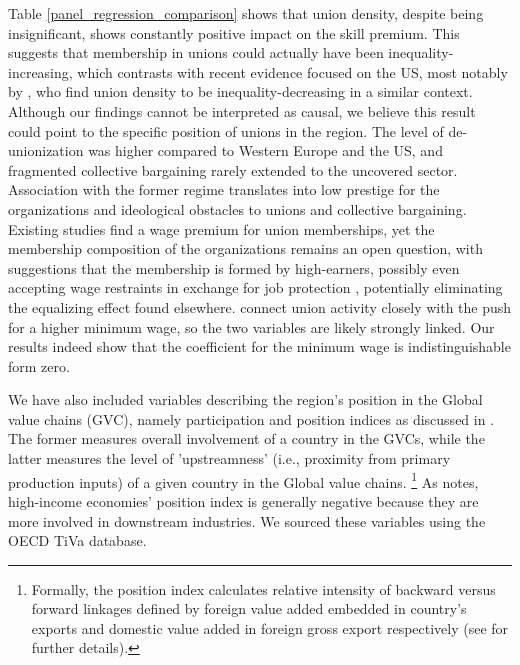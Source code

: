 \documentclass[11pt]{article}
\begin{document}
Table \ref{panel_regression_comparison} shows that union density, despite 
being insignificant, shows constantly positive impact on the skill premium. This suggests that membership in unions could actually have been inequality-increasing, which contrasts with recent evidence focused on the US, most notably by \citet{farber2021unions}, who find union density to be inequality-decreasing in a similar context. Although our findings cannot be interpreted as causal, we believe this result could point to the specific position of unions in the region. The level of de-unionization was higher compared to Western Europe and the US, and fragmented collective bargaining rarely extended to the uncovered sector. Association with the former regime translates into low prestige for the organizations and ideological obstacles to unions and collective bargaining. Existing studies find a wage premium for union memberships, yet the membership composition of the organizations remains an open question, with suggestions that the membership is formed by high-earners, possibly even accepting wage restraints in exchange for job protection \citep{magda2017trade}, potentially eliminating the equalizing effect found elsewhere. \citet{farber2021unions} connect union activity closely with the push for a higher minimum wage, so the two variables are likely strongly linked. Our results indeed show that the coefficient for the minimum wage is indistinguishable form zero.

We have also included variables describing the region's position in the Global value chains (GVC), namely participation and position indices as discussed in \citet{coveri2024global}. The former measures overall involvement of a country in the GVCs, while the latter measures the level of 'upstreamness' (i.e., proximity from primary production inputs) of a given country in the Global value chains. \footnote{Formally, the position index calculates relative intensity of backward versus forward linkages defined by foreign value added embedded in country's exports and domestic value added in foreign gross export respectively (see \cite{coveri2024global} for further details).} As \cite{coveri2024global} notes, high-income economies' position index is generally negative because they are more involved in downstream industries. We sourced these variables using the OECD TiVa database.
\end{document}
